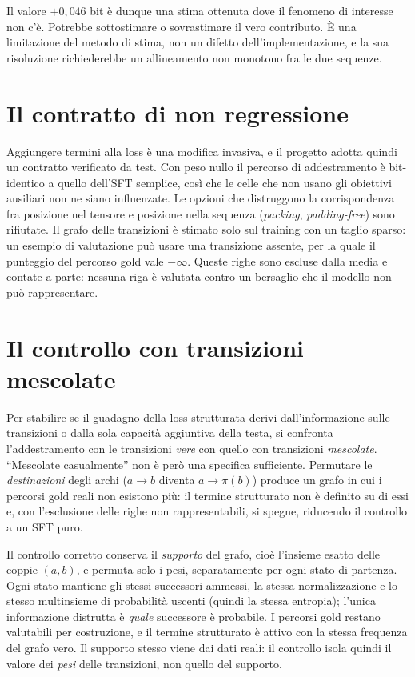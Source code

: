 Il valore $+0{,}046$ bit è dunque una stima ottenuta dove il fenomeno di
interesse non c'è. Potrebbe sottostimare o sovrastimare il vero contributo. È una
limitazione del metodo di stima, non un difetto dell'implementazione, e la sua
risoluzione richiederebbe un allineamento non monotono fra le due sequenze.

\section{Il contratto di non regressione}
\label{sec:contratto-ausiliari}

Aggiungere termini alla loss è una modifica invasiva, e il progetto adotta
quindi un contratto verificato da test. Con peso nullo il percorso di
addestramento è bit-identico a quello dell'SFT semplice, così che le celle che
non usano gli obiettivi ausiliari non ne siano influenzate. Le opzioni che
distruggono la corrispondenza fra posizione nel tensore e posizione nella
sequenza (\emph{packing}, \emph{padding-free}) sono rifiutate. Il grafo delle
transizioni è stimato solo sul training con un taglio sparso: un esempio di
valutazione può usare una transizione assente, per la quale il punteggio del
percorso gold vale $-\infty$. Queste righe sono escluse dalla media e contate a
parte: nessuna riga è valutata contro un bersaglio che il modello non può
rappresentare.

\section{Il controllo con transizioni mescolate}
\label{sec:controllo-mescolato}

Per stabilire se il guadagno della loss strutturata derivi dall'informazione
sulle transizioni o dalla sola capacità aggiuntiva della testa, si confronta
l'addestramento con le transizioni \emph{vere} con quello con transizioni
\emph{mescolate}. ``Mescolate casualmente'' non è però una specifica sufficiente.
Permutare le \emph{destinazioni} degli archi ($a \to b$ diventa
$a \to \pi(b)$) produce un grafo in cui i percorsi gold reali non esistono più:
il termine strutturato non è definito su di essi e, con l'esclusione delle righe
non rappresentabili, si spegne, riducendo il controllo a un SFT puro.

Il controllo corretto conserva il \emph{supporto} del grafo, cioè l'insieme
esatto delle coppie $(a, b)$, e permuta solo i pesi, separatamente per ogni stato
di partenza. Ogni stato mantiene gli stessi successori ammessi, la stessa
normalizzazione e lo stesso multinsieme di probabilità uscenti (quindi la stessa
entropia); l'unica informazione distrutta è \emph{quale} successore è probabile.
I percorsi gold restano valutabili per costruzione, e il termine strutturato è
attivo con la stessa frequenza del grafo vero. Il supporto stesso viene dai dati
reali: il controllo isola quindi il valore dei \emph{pesi} delle transizioni,
non quello del supporto.

